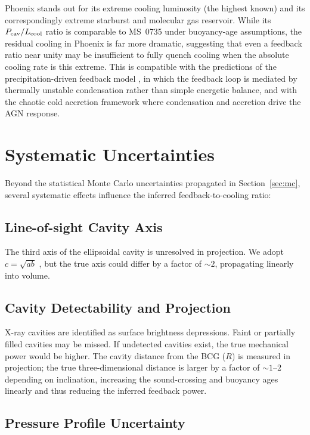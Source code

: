 \documentclass[twocolumn]{aastex63}
\newcommand{\Lcool}{L_{\rm cool}}
\newcommand{\Pcav}{P_{\rm cav}}
\begin{document}
Phoenix stands out for its extreme cooling luminosity (the highest known) and its
correspondingly extreme starburst and molecular gas reservoir. While its
$\Pcav/\Lcool$ ratio is comparable to MS~0735 under buoyancy-age assumptions, the
residual cooling in Phoenix is far more dramatic, suggesting that even a feedback
ratio near unity may be insufficient to fully quench cooling when the absolute
cooling rate is this extreme. This is compatible with the predictions of the precipitation-driven
feedback model \citep{Voit2015}, in which the feedback loop is mediated by
thermally unstable condensation rather than simple energetic balance, and with
the chaotic cold accretion framework \citep{Gaspari2013} where condensation and
accretion drive the AGN response.

\section{Systematic Uncertainties}
\label{sec:systematics}

Beyond the statistical Monte Carlo uncertainties propagated in
Section~\ref{sec:mc}, several systematic effects influence the inferred
feedback-to-cooling ratio:

\subsection{Line-of-sight Cavity Axis}

The third axis of the ellipsoidal cavity is unresolved in projection. We adopt
$c = \sqrt{ab}$ \citep{Birzan2004}, but the true axis could differ by a factor
of ${\sim}2$, propagating linearly into volume.

\subsection{Cavity Detectability and Projection}

X-ray cavities are identified as surface brightness depressions. Faint or
partially filled cavities may be missed. If undetected cavities exist, the true
mechanical power would be higher. The cavity distance from the BCG ($R$) is
measured in projection; the true three-dimensional distance is larger by a
factor of ${\sim}1$--2 depending on inclination, increasing the sound-crossing
and buoyancy ages linearly and thus reducing the inferred feedback power.

\subsection{Pressure Profile Uncertainty}
\end{document}
